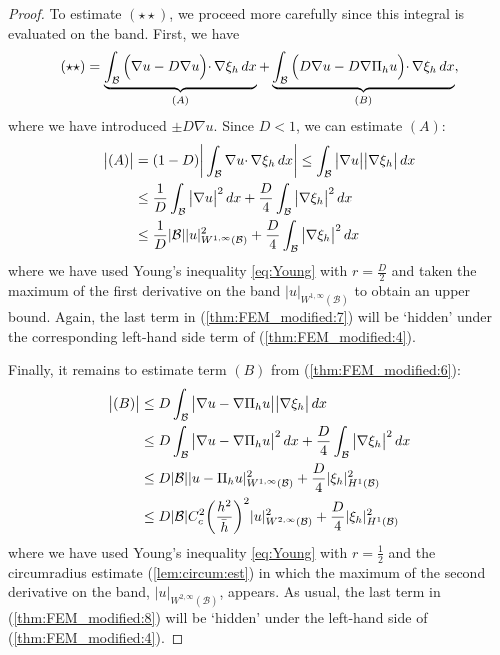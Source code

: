 \documentclass{article}
\theoremstyle{remark}
\def \d {{\rm d}}
\def\dx{\,\d x }
\def\B{\mathcal{B}}
\def\WIi{W^{1,\infty}}
\def\WIIi{W^{2,\infty}}
\def\width{\bar{h}}
\begin{document}
\begin{proof}
    To estimate $(\star\star)$, we proceed more carefully since this integral is evaluated on the band. First, we have
    \begin{equation}
    \label{thm:FEM_modified:6}
    (\star\star) =\underbrace{\int_\B \Big(\nabla u -D\nabla u \Big)\cdotp\nabla \xi_h \dx}_{(A)} +\underbrace{\int_\B \Big(D\nabla u -D\nabla\Pi_h u\Big)\cdotp\nabla \xi_h \dx}_{(B)},
    \end{equation}
    where we have introduced $\pm D\nabla u$. Since $D<1$,  we can estimate $(A)$:
    \begin{equation}
    \label{thm:FEM_modified:7}
    \begin{split}
    \big|(A)\big|&= (1-D)\bigg|\int_\B \nabla u \cdotp\nabla \xi_h \dx\bigg|\leq \int_\B \big|\nabla u\big|\big|\nabla \xi_h \big|\dx\\ &\leq \frac{1}{D} \int_\B \big|\nabla u\big|^2\dx +\frac{D}{4} \int_\B \big|\nabla \xi_h \big|^2\dx\\ &\leq \frac{1}{D}|\B| |u|_{\WIi(\B)}^2 +\frac{D}{4} \int_\B \big|\nabla \xi_h \big|^2\dx
    \end{split}
    \end{equation}
    where we have used Young's inequality \eqref{eq:Young} with $r=\tfrac{D}{2}$ and taken the maximum of the first derivative on the band $|u|_{\WIi(\B)}$ to obtain an upper bound. Again, the last term in (\ref{thm:FEM_modified:7}) will be `hidden' under the corresponding left-hand side term of (\ref{thm:FEM_modified:4}).
    
    Finally, it remains to estimate term $(B)$ from (\ref{thm:FEM_modified:6}):
    \begin{equation}
    \begin{split}
    \label{thm:FEM_modified:8}
    \big|(B)\big| &\leq D\int_\B \big|\nabla u -\nabla\Pi_h u\big|\big|\nabla \xi_h\big| \dx\\ &\leq D\int_\B \big|\nabla u -\nabla\Pi_h u\big|^2\dx +\frac{D}{4}\int_\B\big|\nabla \xi_h\big|^2 \dx\\
    &\leq D|\B||u-\Pi_h u|^2_{\WIi(\B)} +\frac{D}{4}|\xi_h|_{H^1(\B)}^2\\ 
    &\leq D|\B|C_c^2 \bigg(\frac{h^2}{\width}\bigg)^2 |u|^2_{\WIIi(\B)} +\frac{D}{4}|\xi_h|_{H^1(\B)}^2
    \end{split}
    \end{equation}
    where we have used Young's inequality \eqref{eq:Young} with $r=\tfrac{1}{2}$ and the circumradius estimate (\ref{lem:circum:est}) in which the maximum of the second derivative on the band, $|u|_{\WIIi(\B)}$,  appears. As usual, the last term in (\ref{thm:FEM_modified:8}) will be `hidden' under the left-hand side of (\ref{thm:FEM_modified:4}).
    

\end{proof}
\end{document}
